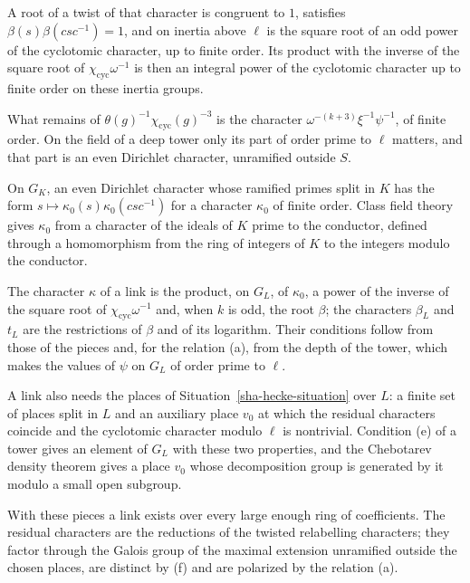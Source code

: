 A root of a twist of that character is congruent to $1$, satisfies $\beta(s)\beta(csc^{-1})=1$, and on inertia above $\ell$ is the square root of an odd power of the cyclotomic character, up to finite order. Its product with the inverse of the square root of $\chi_{\mathrm{cyc}}\omega^{-1}$ is then an integral power of the cyclotomic character up to finite order on these inertia groups.

What remains of $\theta(g)^{-1}\chi_{\mathrm{cyc}}(g)^{-3}$ is the character $\omega^{-(k+3)}\xi^{-1}\psi^{-1}$, of finite order. On the field of a deep tower only its part of order prime to $\ell$ matters, and that part is an even Dirichlet character, unramified outside $S$.

On $G_K$, an even Dirichlet character whose ramified primes split in $K$ has the form $s\mapsto\kappa_0(s)\kappa_0(csc^{-1})$ for a character $\kappa_0$ of finite order. Class field theory gives $\kappa_0$ from a character of the ideals of $K$ prime to the conductor, defined through a homomorphism from the ring of integers of $K$ to the integers modulo the conductor.

The character $\kappa$ of a link is the product, on $G_L$, of $\kappa_0$, a power of the inverse of the square root of $\chi_{\mathrm{cyc}}\omega^{-1}$ and, when $k$ is odd, the root $\beta$; the characters $\beta_L$ and $t_L$ are the restrictions of $\beta$ and of its logarithm. Their conditions follow from those of the pieces and, for the relation (a), from the depth of the tower, which makes the values of $\psi$ on $G_L$ of order prime to $\ell$.

A link also needs the places of Situation~\ref{sha-hecke-situation} over $L$: a finite set of places split in $L$ and an auxiliary place $v_0$ at which the residual characters coincide and the cyclotomic character modulo $\ell$ is nontrivial. Condition (e) of a tower gives an element of $G_L$ with these two properties, and the Chebotarev density theorem gives a place $v_0$ whose decomposition group is generated by it modulo a small open subgroup.

With these pieces a link exists over every large enough ring of coefficients. The residual characters are the reductions of the twisted relabelling characters; they factor through the Galois group of the maximal extension unramified outside the chosen places, are distinct by (f) and are polarized by the relation (a).

